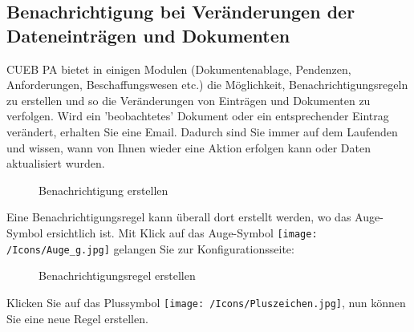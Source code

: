 \subsection{Benachrichtigung bei Veränderungen der Dateneinträgen und Dokumenten}
\label{bkm:Ref2018080601}

CUEB PA bietet in einigen Modulen (Dokumentenablage, Pendenzen, Anforderungen, Beschaffungswesen etc.) die Möglichkeit, Benachrichtigungsregeln zu erstellen und so die Veränderungen von Einträgen und Dokumenten zu verfolgen. Wird ein 'beobachtetes' Dokument oder ein entsprechender Eintrag verändert, erhalten Sie eine Email. Dadurch sind Sie immer auf dem Laufenden und wissen, wann von Ihnen wieder eine Aktion erfolgen kann oder Daten aktualisiert wurden.

\begin{figure}[H]
\caption{Benachrichtigung erstellen}
\end{figure}

Eine Benachrichtigungsregel kann überall dort erstellt werden, wo das Auge-Symbol ersichtlich ist. Mit Klick auf das Auge-Symbol \texttt{[image: /Icons/Auge\_g.jpg]}  gelangen Sie zur Konfigurationsseite:

\begin{figure}[H]
\caption{Benachrichtigungsregel erstellen}
\end{figure}

Klicken Sie auf das Plussymbol \texttt{[image: /Icons/Pluszeichen.jpg]}, nun können Sie eine neue Regel erstellen.

